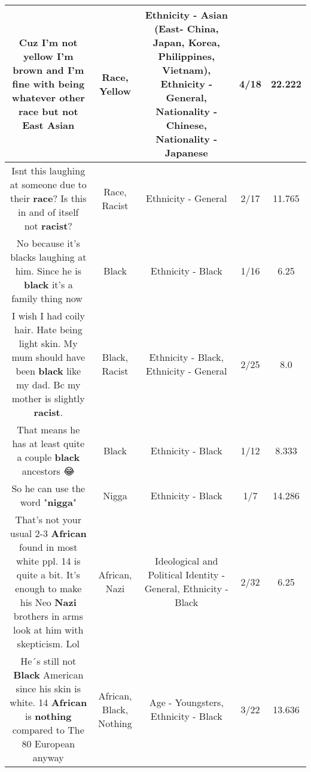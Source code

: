 \documentclass[11pt]{article}
\newlength\mylength
\begin{document}
\begin{center}
\begin{longtable}{|C{.65\mylength}|C{.30\mylength}|C{.12\mylength}|C{.12\mylength}|C{.12\mylength}|}
  \small Cuz I'm not \textbf{y\textbf{e\textbf{llow}}} I'm brown and I'm fine with being whatever other \textbf{race} but not East Asian\normalsize   & Race, Yellow & Ethnicity - Asian (East- China, Japan, Korea, Philippines, Vietnam), Ethnicity - General, Nationality - Chinese, Nationality - Japanese & 4/18 & 22.222 \\  \hline
  \small Isnt this laughing at someone due to their \textbf{race}? Is this in and of itself not \textbf{racist}?\normalsize   & Race, Racist & Ethnicity - General & 2/17 & 11.765 \\  \hline
  \small No because it's blacks laughing at him. Since he is \textbf{black} it's a family thing now🤣\normalsize   & Black & Ethnicity - Black & 1/16 & 6.25 \\  \hline
  \small I wish I had coily hair. Hate being light skin. My mum should have been \textbf{black} like my dad. Bc my mother is slightly \textbf{racist}.\normalsize   & Black, Racist & Ethnicity - Black, Ethnicity - General & 2/25 & 8.0 \\  \hline
  \small That means he has at least quite a couple \textbf{black} ancestors 😂\normalsize   & Black & Ethnicity - Black & 1/12 & 8.333 \\  \hline
  \small So he can use the word "\textbf{nigga}"\normalsize   & Nigga & Ethnicity - Black & 1/7 & 14.286 \\  \hline
  \small That's not your usual 2-3 \textbf{African} found in most white ppl. 14 is quite a bit. It's enough to make his Neo \textbf{Nazi} brothers in arms look at him with skepticism. Lol\normalsize   & African, Nazi &  Ideological and Political Identity - General, Ethnicity - Black & 2/32 & 6.25 \\  \hline
  \small He´s still not \textbf{Black} American since his skin is white. 14  \textbf{African} is \textbf{nothing} compared to The 80  European anyway\normalsize   & African, Black, Nothing & Age - Youngsters, Ethnicity - Black & 3/22 & 13.636 \\  \hline

\end{longtable}
\end{center}
\end{document}
